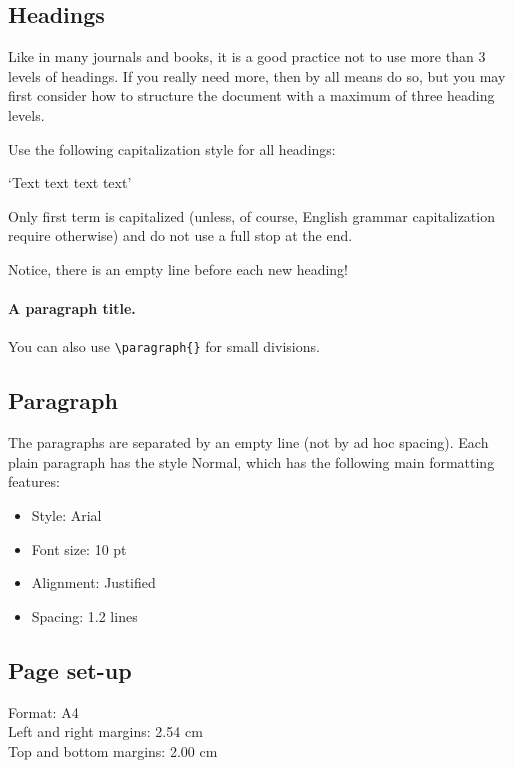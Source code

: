 \documentclass{newseye_del}
\begin{document}
\subsection{Headings}

Like in many journals and books, it is a good practice not to use more than 3
levels of headings. If you really need more, then by all means do so, but you
may first consider how to structure the document with a maximum of three heading
levels.

Use the following capitalization style for all headings:

`Text text text text'

Only first term is capitalized (unless, of course, English grammar
capitalization require otherwise) and do not use a full stop at the end.

Notice, there is an empty line before each new heading!

\paragraph{A paragraph title.}
You can also use \verb.\paragraph{}. for small divisions.


\subsection{Paragraph}

The paragraphs are separated by an empty line (not by ad hoc spacing). Each
plain paragraph has the style Normal, which has the following main formatting
features:

\begin{itemize}
    \item Style: Arial
    \item Font size: 10 pt
    \item Alignment: Justified
    \item Spacing: 1.2 lines
\end{itemize}

\subsection{Page set-up}

Format: A4 \\
Left and right margins: 2.54 cm \\
Top and bottom margins: 2.00 cm \\
\end{document}
